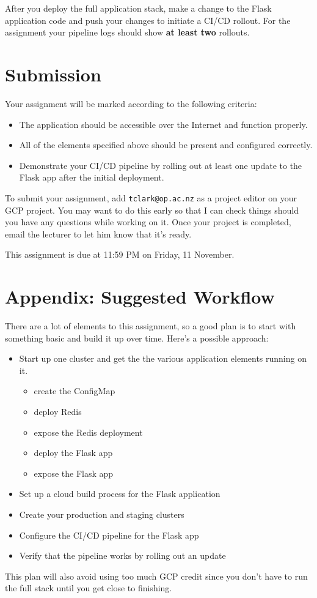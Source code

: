 \documentclass{article}
\begin{document}
After you deploy the full application stack, make a change to the Flask application code and push your changes to initiate a CI/CD rollout. For the assignment your pipeline logs should show \textbf{at least two} rollouts. 

\section{Submission}
Your assignment will be marked according to the following criteria:

  \begin{itemize} 
    \item The application should be accessible over the Internet and function properly.
    \item All of the elements specified above should be present and configured correctly.
    \item Demonstrate your CI/CD pipeline by rolling out at least one update to the Flask app after the initial deployment.
  \end{itemize}   

To submit your assignment, add \texttt{tclark@op.ac.nz} as a project editor on your GCP project. You may want to do this early so that I can check things should you have any questions while working on it. Once your project is completed, email the lecturer to let him know that it's ready.

This assignment is due at 11:59 PM on Friday, 11 November.

\section{Appendix: Suggested Workflow}

There are a lot of elements to this assignment, so a good plan is to start with something basic and build it up over time. Here's a possible approach:

\begin{itemize}
  \item Start up one cluster and get the the various application elements running on it.
    \begin{itemize}
      \item create the ConfigMap
      \item deploy Redis 
      \item expose the Redis deployment
      \item deploy the Flask app
      \item expose the Flask app
     \end{itemize} 
  \item Set up a cloud build process for the Flask application
  \item Create your production and staging clusters
  \item Configure the CI/CD pipeline for the Flask app
  \item Verify that the pipeline works by rolling out an update
\end{itemize}

This plan will also avoid using too much GCP credit since you don't have to run the full stack until you get close to finishing.  
\end{document}
